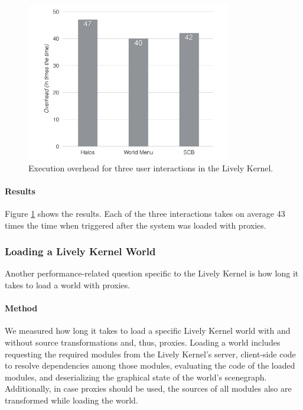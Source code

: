 \begin{figure}[h!]
    \centering
    \includegraphics[width=0.8\textwidth]{figures/6_evaluation/4_LivelyInteractionsOverhead.pdf}
    \caption{Execution overhead for three user interactions in the Lively Kernel.}
    \label{fig:LivelyInteractionsOverhead}
\end{figure}

\paragraph{Results}
Figure \ref{fig:LivelyInteractionsOverhead} shows the results.
Each of the three interactions takes on average 43 times the time when triggered after the system was loaded with proxies.



\subsubsection{Loading a Lively Kernel World}

Another performance-related question specific to the Lively Kernel is how long it takes to load a world with proxies.

\paragraph{Method}
We measured how long it takes to load a specific Lively Kernel world with and without source transformations and, thus, proxies.
Loading a world includes requesting the required modules from the Lively Kernel's server, client-side code to resolve dependencies among those modules, evaluating the code of the loaded modules, and deserializing the graphical state of the world's scenegraph.
Additionally, in case proxies should be used, the sources of all modules also are transformed while loading the world.

